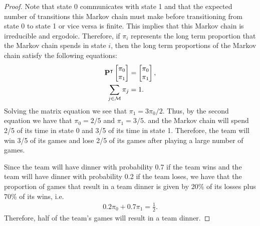 \begin{proof}
  Note that state 0 communicates with state 1 and that the expected number of transitions
  this Markov chain must make before transitioning from state 0 to state 1 or vice versa is finite.
  This implies that this Markov chain is irreducible and ergodoic. Therefore, if $\pi_i$ represents
  the long term proportion that the Markov chain spends in state $i$, then the
  long term proportions of the Markov chain satisfy the following equations:
  \begin{align*}
     \bold{P}^\intercal \begin{bmatrix} \pi_0 \\ \pi_1 \\ \end{bmatrix} &= \begin{bmatrix} \pi_0 \\ \pi_1 \\ \end{bmatrix},\\
     \sum_{j\in \mathcal{M}} \pi_j &= 1.
  \end{align*}
  Solving the matrix equation we see that $\pi_1 = 3\pi_0/2$. Thus, by the second equation we have that $\pi_0 = 2/5$ and $\pi_1 = 3/5$.
  and the Markov chain will spend 2/5 of its time in state 0 and 3/5 of its time in state 1. Therefore,
  the team will win 3/5 of its games and lose 2/5 of its games after playing a large number of games.

  Since the team will have dinner with probability 0.7 if the team wins and the team will have
  dinner with probability 0.2 if the team loses, we have that the proportion of games
  that result in a team dinner is given by 20\% of its losses plus 70\% of its wins, i.e.\
  \begin{align*}
    0.2 \pi_0 + 0.7 \pi_1 = \frac{1}{2}.
  \end{align*}
  Therefore, half of the team's games will result in a team dinner.
\end{proof}
\newpage
